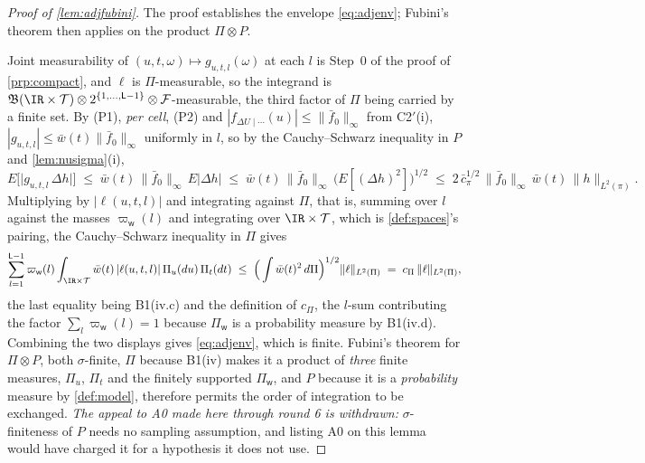\begin{proof}[Proof of \cref{lem:adjfubini}]
The proof establishes the envelope \eqref{eq:adjenv}; Fubini's theorem then applies on the product
$\Pi\otimes P$.

Joint measurability of $(u,t,\omega)\mapsto g_{u,t,l}(\omega)$ at each $l$ is Step~0 of the proof of
\cref{prp:compact}, and $\ell$ is $\Pi$-measurable, so the integrand is
$\mathfrak B(\IR\times\mathcal T)\otimes2^{\{1,\dots,\mathsf L-1\}}\otimes\mathcal F$-measurable, the
third factor of $\Pi$ being carried by a finite set. By (P1), \emph{per cell}, (P2) and
$|f_{\Delta U\mid\cdots}(u)|\le\|\bar f_0\|_\infty$
from C2$'$(i), $|g_{u,t,l}|\le\bar w(t)\|\bar f_0\|_\infty$ uniformly in $l$, so by the Cauchy--Schwarz
inequality in $P$ and \cref{lem:nusigma}(i),
\[
E\big[\big|g_{u,t,l}\,\Delta h\big|\big]\;\le\;\bar w(t)\,\|\bar f_0\|_\infty\,E\big|\Delta h\big|
\;\le\;\bar w(t)\,\|\bar f_0\|_\infty\,\big(E[(\Delta h)^{2}]\big)^{1/2}
\;\le\;2\,\bar c_\pi^{1/2}\,\|\bar f_0\|_\infty\,\bar w(t)\,\|h\|_{L^{2}(\pi)} .
\]
Multiplying by $|\ell(u,t,l)|$ and integrating against $\Pi$, that is, summing over $l$ against the
masses $\varpi_{\mathsf w}(l)$ and integrating over $\IR\times\mathcal T$, which is \cref{def:spaces}'s
pairing, the Cauchy--Schwarz inequality in $\Pi$ gives
\[
\sum_{l=1}^{\mathsf L-1}\varpi_{\mathsf w}(l)\int_{\IR\times\mathcal T}\bar w(t)\,|\ell(u,t,l)|\,\Pi_u(du)\,\Pi_t(dt)
\;\le\;\Big(\int\bar w(t)^{2}\,d\Pi\Big)^{1/2}\|\ell\|_{L^{2}(\Pi)}
\;=\;c_\Pi\,\|\ell\|_{L^{2}(\Pi)},
\]
the last equality being B1(iv.c) and the definition of $c_\Pi$, the $l$-sum contributing the factor
$\sum_l\varpi_{\mathsf w}(l)=1$ because $\Pi_{\mathsf w}$ is a probability measure by B1(iv.d).
Combining the two displays gives
\eqref{eq:adjenv}, which is finite. Fubini's theorem for $\Pi\otimes P$, both $\sigma$-finite, $\Pi$
because B1(iv) makes it a product of \emph{three} finite measures, $\Pi_u$, $\Pi_t$ and the finitely
supported $\Pi_{\mathsf w}$, and $P$ because it is a \emph{probability}
measure by \cref{def:model}, therefore permits the order of integration to be exchanged.
\emph{The appeal to A0 made here through round 6 is withdrawn:} $\sigma$-finiteness of $P$ needs no
sampling assumption, and listing A0 on this lemma would have charged it for a hypothesis it does not use.
\end{proof}

